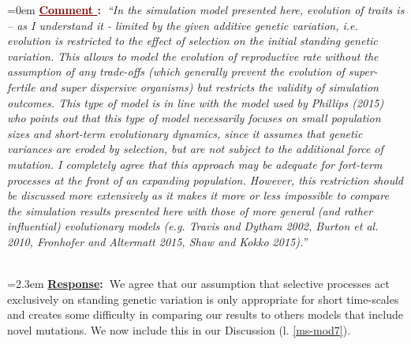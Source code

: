 \documentclass[12pt]{article}
\newcounter{cN}
\newcommand{\comment}[1]{
	\vspace{2em}
	\refstepcounter{cN} %
	\noindent \hangindent=0em \textbf{\textcolor{Maroon}{\uline{Comment \thecN}:~}}\emph{``#1''}
	}
\newcommand{\response}[1]{
	\\[0.25em]
	\hangindent=2.3em \textbf{\textcolor{NavyBlue}{\uline{Response}:~}}#1
	}
\begin{document}
\comment{In the simulation model presented here, evolution of traits is – as I understand it - limited by the given additive genetic variation, i.e. evolution is restricted to the effect of selection on the initial standing genetic variation.
This allows to model the evolution of reproductive rate without the assumption of any trade-offs (which generally prevent the evolution of super-fertile and super dispersive organisms) but restricts the validity of simulation outcomes.
This type of model is in line with the model used by Phillips (2015) who points out that this type of model necessarily focuses on small population sizes and short-term evolutionary dynamics, since it assumes that genetic variances are eroded by selection, but are not subject to the additional force of mutation.
I completely agree that this approach may be adequate for fort-term processes at the front of an expanding population.
However, this restriction should be discussed more extensively as it makes it more or less impossible to compare the simulation results presented here with those of more general (and rather influential) evolutionary models (e.g. Travis and Dytham 2002, Burton et al. 2010, Fronhofer and Altermatt 2015, Shaw and Kokko 2015).}
\response{We agree that our assumption that selective processes act exclusively on standing genetic variation is only appropriate for short time-scales and creates some difficulty in comparing our results to others models that include novel mutations. We now include this in our Discussion (l. \ref{ms-mod7}).}
\end{document}
